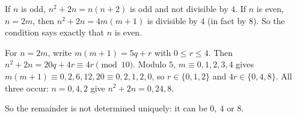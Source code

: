 If $n$ is odd, $n^2+2n=n(n+2)$ is odd and not divisible by $4$. If $n$ is even, $n=2m$, then $n^2+2n=4m(m+1)$ is divisible by $4$ (in fact by $8$). So the condition says exactly that $n$ is even.

For $n=2m$, write $m(m+1)=5q+r$ with $0\le r\le4$. Then $n^2+2n=20q+4r\equiv4r\pmod{10}$. Modulo $5$, $m\equiv0,1,2,3,4$ gives $m(m+1)\equiv0,2,6,12,20\equiv0,2,1,2,0$, so $r\in\{0,1,2\}$ and $4r\in\{0,4,8\}$. All three occur: $n=0,4,2$ give $n^2+2n=0,24,8$.

So the remainder is not determined uniquely: it can be $\boxed{0,\ 4\text{ or }8}$.
